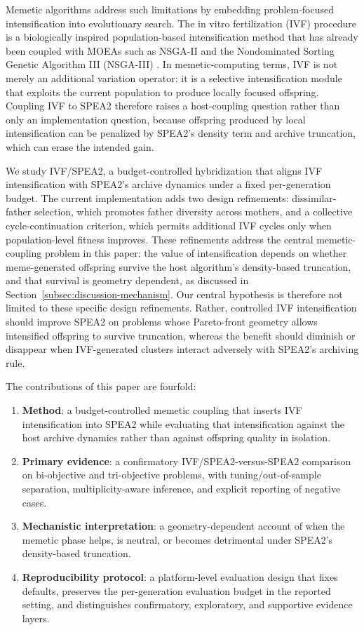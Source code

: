 \documentclass[pdflatex,sn-mathphys-ay]{sn-jnl}%
\theoremstyle{thmstyleone}%
\theoremstyle{thmstyletwo}%
\theoremstyle{thmstylethree}%
\begin{document}
Memetic algorithms address such limitations by embedding problem-focused intensification into evolutionary search. The in vitro fertilization (IVF) procedure is a biologically inspired population-based intensification method \citep{camilo-junior2011} that has already been coupled with MOEAs such as NSGA-II \citep{sampaio2017ivf} and the Nondominated Sorting Genetic Algorithm III (NSGA-III) \citep{Sampaio2024}. In memetic-computing terms, IVF is not merely an additional variation operator: it is a selective intensification module that exploits the current population to produce locally focused offspring. Coupling IVF to SPEA2 therefore raises a host-coupling question rather than only an implementation question, because offspring produced by local intensification can be penalized by SPEA2's density term and archive truncation, which can erase the intended gain.

We study IVF/SPEA2, a budget-controlled hybridization that aligns IVF intensification with SPEA2's archive dynamics under a fixed per-generation budget. The current implementation adds two design refinements: dissimilar-father selection, which promotes father diversity across mothers, and a collective cycle-continuation criterion, which permits additional IVF cycles only when population-level fitness improves. These refinements address the central memetic-coupling problem in this paper: the value of intensification depends on whether meme-generated offspring survive the host algorithm's density-based truncation, and that survival is geometry dependent, as discussed in Section~\ref{subsec:discussion-mechanism}. Our central hypothesis is therefore not limited to these specific design refinements. Rather, controlled IVF intensification should improve SPEA2 on problems whose Pareto-front geometry allows intensified offspring to survive truncation, whereas the benefit should diminish or disappear when IVF-generated clusters interact adversely with SPEA2's archiving rule.

The contributions of this paper are fourfold:
\begin{enumerate}
	\item \textbf{Method}: a budget-controlled memetic coupling that inserts IVF intensification into SPEA2 while evaluating that intensification against the host archive dynamics rather than against offspring quality in isolation.
	\item \textbf{Primary evidence}: a confirmatory IVF/SPEA2-versus-SPEA2 comparison on bi-objective and tri-objective problems, with tuning/out-of-sample separation, multiplicity-aware inference, and explicit reporting of negative cases.
	\item \textbf{Mechanistic interpretation}: a geometry-dependent account of when the memetic phase helps, is neutral, or becomes detrimental under SPEA2's density-based truncation.
	\item \textbf{Reproducibility protocol}: a platform-level evaluation design that fixes defaults, preserves the per-generation evaluation budget in the reported setting, and distinguishes confirmatory, exploratory, and supportive evidence layers.
\end{enumerate}
\end{document}
